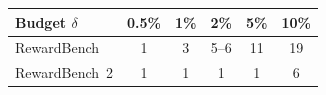 \begin{tabular}{lccccc}
\toprule
Budget $\delta$ & 0.5\% & 1\% & 2\% & 5\% & 10\%\\
\midrule
RewardBench & 1 & 3 & 5--6 & 11 & 19\\
RewardBench~2 & 1 & 1 & 1 & 1 & 6\\
\bottomrule
\end{tabular}
